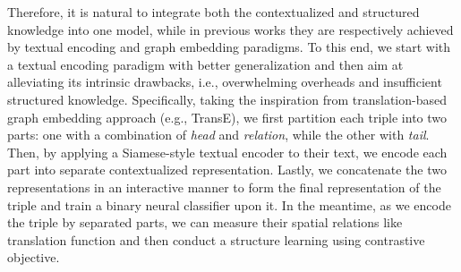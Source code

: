 \documentclass[sigconf]{acmart}
\begin{document}
Therefore, it is natural to integrate both the contextualized and structured knowledge into one model, while in previous works they are respectively achieved by textual encoding and graph embedding paradigms. 
To this end, we start with a textual encoding paradigm with better generalization and then aim at alleviating its intrinsic drawbacks, i.e., overwhelming overheads and insufficient structured knowledge. 
Specifically, taking the inspiration from translation-based graph embedding approach (e.g., TransE), we first partition each triple into two parts: one with a combination of \textit{head} and \textit{relation}, while the other with \textit{tail}. Then, by applying a Siamese-style textual encoder to their text, we encode each part into separate contextualized representation. 
Lastly, we concatenate the two representations in an interactive manner \cite{reimers2019sentbert} to form the final representation of the triple and train a binary neural classifier upon it. 
In the meantime, as we encode the triple by separated parts, we can measure their spatial relations like translation function \cite{TransE,sun2019rotate} and then conduct a structure learning using contrastive objective. 
\end{document}
